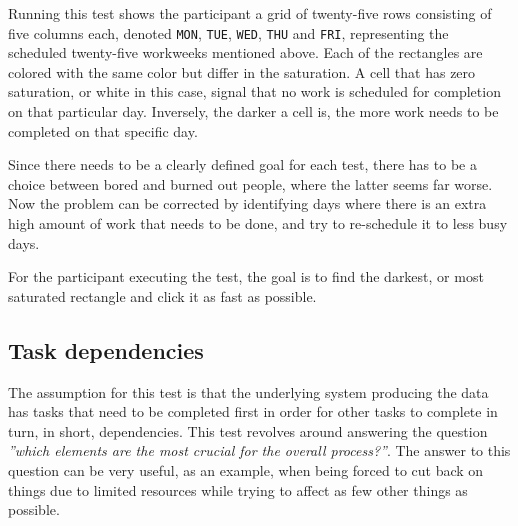 {    Running this test shows the participant a grid of twenty-five rows
    consisting of five columns each, denoted
    \texttt{MON},
    \texttt{TUE},
    \texttt{WED},
    \texttt{THU} and
    \texttt{FRI},
    representing the scheduled twenty-five workweeks mentioned above. Each
    of the rectangles are colored with the same color but differ in the
    saturation. A cell that has zero saturation, or white in this case,
    signal that no work is scheduled for completion on that particular day.
    Inversely, the darker a cell is, the more work needs to be completed on
    that specific day.

    Since there needs to be a clearly defined goal for each test, there has
    to be a choice between bored and burned out people, where the latter
    seems far worse. Now the problem can be corrected by identifying days
    where there is an extra high amount of work that needs to be done, and
    try to re-schedule it to less busy days.

    For the participant executing the test, the goal is to find the
    darkest, or most saturated rectangle and click it as fast as possible.

  \newpage
  \subsection{Task dependencies}

    \textit{\ideaThree}

    The assumption for this test is that the underlying system producing
    the data has tasks that need to be completed first in order for other
    tasks to complete in turn, in short, dependencies. This test revolves
    around answering the question
    \textit{''which elements are the most crucial for the overall
      process?''}. The answer to this question can be very useful, as an
    example, when being forced to cut back on things due to limited
    resources while trying to affect as few other things as possible.

}
